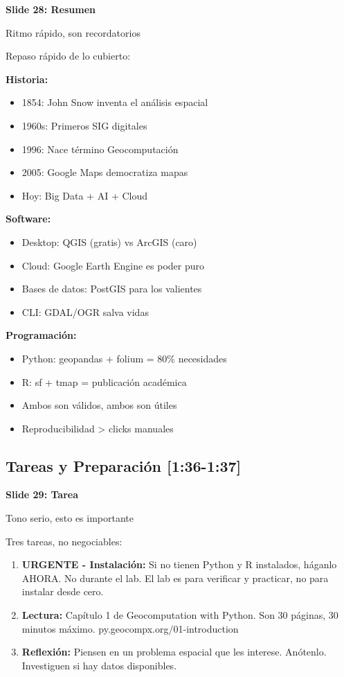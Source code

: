 \documentclass[11pt,a4paper]{article}
\newcommand{\tiempo}[1]{\textcolor{timecolor}{\faIcon{clock} \textbf{[#1]}}}
\newcommand{\decir}[1]{\begin{tcolorbox}[colback=blue!5,colframe=usachblue,title={\faIcon{microphone} DECIR}]#1\end{tcolorbox}}
\newcommand{\hacer}[1]{\begin{tcolorbox}[colback=green!5,colframe=green!50!black,title={\faIcon{hand-point-right} HACER}]#1\end{tcolorbox}}
\begin{document}
\textbf{Slide 28: Resumen}

\hacer{Ritmo rápido, son recordatorios}

\decir{
Repaso rápido de lo cubierto:

\textbf{Historia:}
\begin{itemize}
    \item 1854: John Snow inventa el análisis espacial
    \item 1960s: Primeros SIG digitales
    \item 1996: Nace término Geocomputación
    \item 2005: Google Maps democratiza mapas
    \item Hoy: Big Data + AI + Cloud
\end{itemize}

\textbf{Software:}
\begin{itemize}
    \item Desktop: QGIS (gratis) vs ArcGIS (caro)
    \item Cloud: Google Earth Engine es poder puro
    \item Bases de datos: PostGIS para los valientes
    \item CLI: GDAL/OGR salva vidas
\end{itemize}

\textbf{Programación:}
\begin{itemize}
    \item Python: geopandas + folium = 80\% necesidades
    \item R: sf + tmap = publicación académica
    \item Ambos son válidos, ambos son útiles
    \item Reproducibilidad > clicks manuales
\end{itemize}
}

\subsection{Tareas y Preparación \tiempo{1:36-1:37}}

\textbf{Slide 29: Tarea}

\hacer{Tono serio, esto es importante}

\decir{
Tres tareas, no negociables:

\begin{enumerate}
    \item \textbf{URGENTE - Instalación:} Si no tienen Python y R instalados, háganlo AHORA. No durante el lab. El lab es para verificar y practicar, no para instalar desde cero.
    
    \item \textbf{Lectura:} Capítulo 1 de Geocomputation with Python. Son 30 páginas, 30 minutos máximo. py.geocompx.org/01-introduction
    
    \item \textbf{Reflexión:} Piensen en un problema espacial que les interese. Anótenlo. Investiguen si hay datos disponibles.
\end{enumerate}
}
\end{document}
